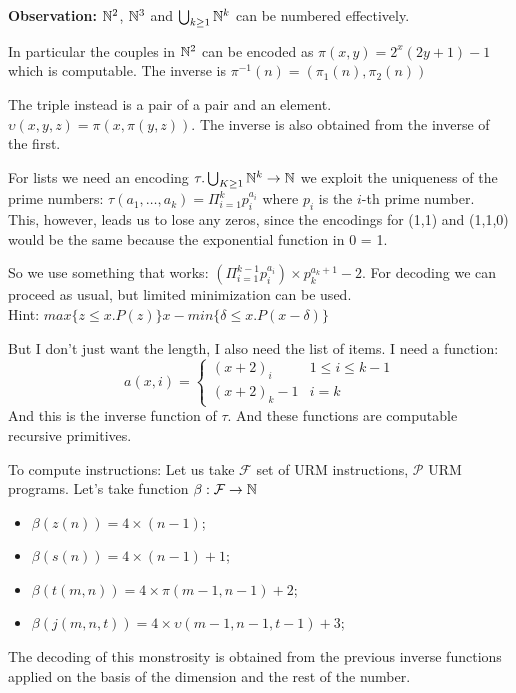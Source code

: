 \textbf{Observation:} $ \mathbb{N}^2 $, $ \mathbb{N}^3 $ and
$ \bigcup_{k\geq 1} \mathbb{N}^k $ can be numbered effectively.

In particular the couples in $ \mathbb{N}^2 $ can be encoded as
$ \pi(x,y) = 2^x(2y+1)-1 $ which is computable. The inverse is
$ \pi^{-1}(n) = (\pi_1(n), \pi_2(n)) $

The triple instead is a pair of a pair and an element.
$ \upsilon (x,y,z) = \pi (x, \pi(y,z))$. The inverse is also obtained
from the inverse of the first.

For lists we need an encoding
$ \tau . \bigcup_{K \geq 1} \mathbb{N}^k \rightarrow \mathbb{N} $ we exploit the
uniqueness of the prime numbers:
$ \tau(a_1,\dots,a_k) = \Pi_{i=1}^k p_i^{a_i}$ where $ p_i $ is the
$i$-th prime number. \\
This, however, leads us to lose any zeros, since
the encodings for (1,1) and (1,1,0) would be the same because the
exponential function in 0 = 1.

So we use something that works:
$ (\Pi_{i=1}^{k-1} p_i^{a_i}) \times p_k^{a_k+1} - 2$. For decoding we
can proceed as usual, but limited minimization can be used.\\ Hint:
$ max \{z \leq x . P(z)\} x - min\{\delta \leq x . P(x-\delta)\}$

But I don't just want the length, I also need the list of items. I
need a function:
\begin{equation*}
  a(x,i) = \begin{cases}
    (x+2)_i   & 1 \leq i \leq k-1 \\
    (x+2)_k-1 & i = k
  \end{cases}
\end{equation*}
And this is the inverse function of $\tau$. And these functions are
computable recursive primitives.

To compute instructions: Let us take $ \mathcal{F} $ set of URM
instructions, $ \mathcal{P} $ URM programs. Let's take function
$ \beta:\mathcal{F}\rightarrow\mathbb{N} $
\begin{itemize}
\item $ \beta(z(n)) = 4 \times (n-1) $;
\item $ \beta(s(n)) = 4 \times (n-1)+1 $;
\item $ \beta(t(m,n)) = 4 \times \pi(m-1,n-1)+2 $;
\item $ \beta(j(m,n,t)) = 4 \times \upsilon(m-1,n-1,t-1)+3 $;
\end{itemize}

The decoding of this monstrosity is obtained from the previous inverse
functions applied on the basis of the dimension and the rest of the
number.

